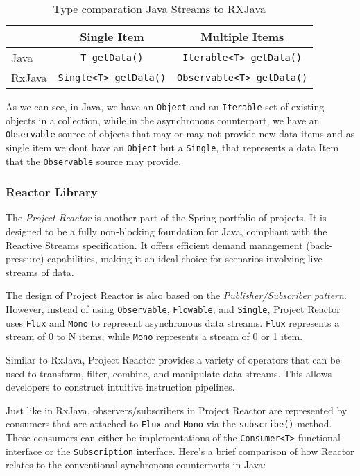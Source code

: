 \begin{table}[h]
	\centering
	\begin{tabular}{|l|c|c|}
	\hline
	& Single Item & Multiple Items \\ 
	\hline
	Java & \texttt{T getData()} & \texttt{Iterable<T> getData()} \\ 
	\hline
	RxJava & \texttt{Single<T> getData()} & \texttt{Observable<T> getData()} \\ 
	\hline
	\end{tabular}
	\caption{Type comparation Java Streams to RXJava}
	\label{tab:my_table}
\end{table}

As we can see, in Java, we have an \texttt{Object} and an \texttt{Iterable} set of existing objects in a collection, while in the asynchronous counterpart, we have an \texttt{Observable} source of objects that may or may not provide new data items and as single item we dont have an \texttt{Object} but a \texttt{Single}, that represents a data Item that the \texttt{Observable} source may provide.

\subsubsection{Reactor Library}
\label{sec:reactor_architecture}

The \textit{Project Reactor} is another part of the Spring portfolio of projects. It is designed to be a fully non-blocking foundation for Java, compliant with the Reactive Streams specification. It offers efficient demand management (back-pressure) capabilities, making it an ideal choice for scenarios involving live streams of data.

The design of Project Reactor is also based on the \textit{Publisher/Subscriber pattern}. However, instead of using \texttt{Observable}, \texttt{Flowable}, and \texttt{Single}, Project Reactor uses \texttt{Flux} and \texttt{Mono} to represent asynchronous data streams. \texttt{Flux} represents a stream of 0 to N items, while \texttt{Mono} represents a stream of 0 or 1 item.

Similar to RxJava, Project Reactor provides a variety of operators that can be used to transform, filter, combine, and manipulate data streams. This allows developers to construct intuitive instruction pipelines. 

Just like in RxJava, observers/subscribers in Project Reactor are represented by consumers that are attached to \texttt{Flux} and \texttt{Mono} via the \texttt{subscribe()} method. These consumers can either be implementations of the \texttt{Consumer<T>} functional interface or the \texttt{Subscription} interface. 
Here's a brief comparison of how Reactor relates to the conventional synchronous counterparts in Java:

